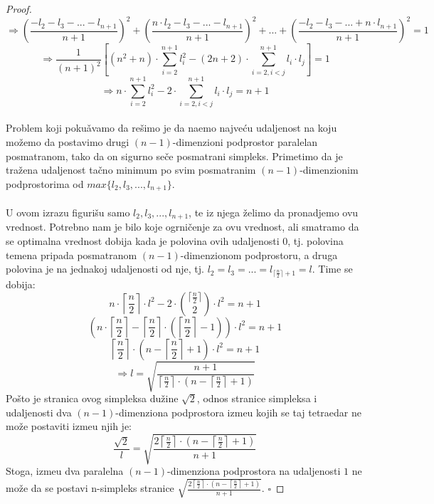 \documentclass[11pt,letter]{article}
\begin{document}
\begin{proof}
$$\Rightarrow \left(\frac{-l_2-l_3-...-l_{n+1}}{n+1}\right)^2+\left(\frac{n\cdot l_2-l_3-...-l_{n+1}}{n+1}\right)^2+...+\left(\frac{-l_2-l_3-...+n\cdot l_{n+1}}{n+1}\right)^2=1$$
$$\Rightarrow \frac{1}{(n+1)^2}\left[ (n^2+n)\cdot {\sum_{i=2}^{n+1} {l_i^2}} - (2n+2)\cdot {\sum_{i=2, i<j}^{n+1} {l_i\cdot l_j} } \right]=1$$
$$\Rightarrow n\cdot {\sum_{i=2}^{n+1} {l_i^2}} - 2\cdot {\sum_{i=2,  i<j}^{n+1} {l_i\cdot l_j} } =n+1$$
\\
\indent Problem koji poku\v avamo da re\v simo je da na\dj emo najve\' cu udaljenost na koju mo\v zemo da postavimo drugi $(n-1)$-dimenzioni podprostor paralelan posmatranom, tako da on sigurno se\v ce posmatrani simpleks. Primetimo da je tra\v zena udaljenost ta\v cno minimum po svim posmatranim $(n-1)$-dimenzionim podprostorima od $max\{l_2, l_3,..., l_{n+1}\}$.
\\
\\
\indent U ovom izrazu figuri\v su samo $l_2, l_3,..., l_{n+1}$, te iz njega \v zelimo da pronadjemo ovu vrednost. Potrebno nam je bilo koje ogrni\v cenje za ovu vrednost, ali smatramo da se optimalna vrednost dobija kada je polovina ovih udaljenosti 0, tj. polovina temena pripada posmatranom $(n-1)$-dimenzionom podprostoru, a druga polovina je na jednakoj udaljenosti od nje, tj. $l_2=l_3=...=l_{\lceil \frac{n}{2}\rceil+1}=l$. Time se dobija:
$$n\cdot \left \lceil{\frac{n}{2}}\right \rceil\cdot l^2-2\cdot {{\lceil{\frac{n}{2}}\rceil}\choose {2}}\cdot l^2=n+1$$
$$\left( n\cdot \left \lceil \frac{n}{2} \right \rceil - {\left \lceil \frac{n}{2} \right\rceil} \cdot \left( \left \lceil \frac{n}{2}\right \rceil -1 \right) \right) \cdot l^2=n+1$$
$$\left \lceil \frac{n}{2} \right \rceil \cdot \left( n-\left \lceil \frac{n}{2}\right \rceil +1 \right)\cdot l^2=n+1$$
$$\Rightarrow l=\sqrt{\frac{n+1}{\left\lceil \frac{n}{2}\right\rceil \cdot \left( n-\left\lceil \frac{n}{2}\right\rceil+1\right)}}$$
Po\v sto je stranica ovog simpleksa du\v zine $\sqrt2$, odnos stranice simpleksa i udaljenosti dva $(n-1)$-dimenziona podprostora izme\dj u  kojih se taj tetraedar ne mo\v ze postaviti izme\dj u njih je:
$$\frac{\sqrt2}{l}=\sqrt{\frac{2\left\lceil \frac{n}{2}\right\rceil\cdot \left( n-\left\lceil\frac{n}{2}\right\rceil+1\right)}{n+1}}$$
Stoga, izme\dj u dva paralelna $(n-1)$-dimenziona podprostora na udaljenosti $1$ ne mo\v ze da se postavi n-simpleks stranice  $\sqrt{\frac{2\left\lceil \frac{n}{2}\right\rceil\cdot \left( n-\left\lceil\frac{n}{2}\right\rceil+1\right)}{n+1}}$.
$\square$
\end{proof}
\\
\smallskip
\\
\end{document}
